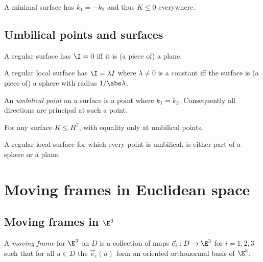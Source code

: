 \documentclass{article}
\begin{document}
\begin{lemma}
    A minimal surface has $k_1=-k_2$ and thus $K \leq 0$ everywhere.
\end{lemma}

\subsection{Umbilical points and surfaces}

\begin{theorem}
    A regular surface has $\I=0$ iff it is (a piece of) a plane.
\end{theorem}

\begin{theorem}
    A regular local surface has $\I = \lambda I$ where $\lambda \not=0$ is a constant iff 
    the surface is (a piece of) a sphere with radius $1/\abs\lambda$.
\end{theorem}

\begin{definition}
    An \emph{umbilical point} on a surface is a point where $k_1=k_2$. Consequently all 
    directions are principal at such a point.
\end{definition}

\begin{lemma}
    For any surface $K\leq H^2$, with equality only at umbilical points.
\end{lemma}

\begin{theorem}
    A regular local surface for which every point is umbilical, is either part of a sphere 
    or a plane.
\end{theorem}

\section{Moving frames in Euclidean space}

\subsection{Moving frames in $\E^3$}

\begin{definition}
    A \emph{moving frame} for $\E^3$ on $D$ is a collection of maps $\vec e_i:D\to\E^3$
    for $i=1,2,3$ such that for all $u\in D$ the $\vec e_i(u)$ form an oriented orthonormal
    basis of $\E^3$.
\end{definition}
\end{document}
